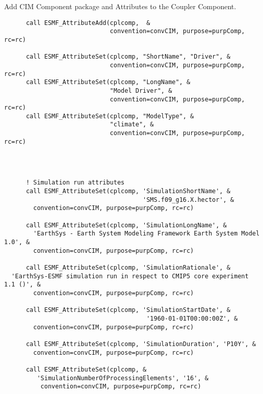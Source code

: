 
  \begin{sloppypar}
      Add CIM Component package and Attributes to the Coupler Component.
  \end{sloppypar} 

 \begin{verbatim}
      call ESMF_AttributeAdd(cplcomp,  &
                             convention=convCIM, purpose=purpComp, rc=rc)

      call ESMF_AttributeSet(cplcomp, "ShortName", "Driver", &
                             convention=convCIM, purpose=purpComp, rc=rc)
      call ESMF_AttributeSet(cplcomp, "LongName", &
                             "Model Driver", &
                             convention=convCIM, purpose=purpComp, rc=rc)
      call ESMF_AttributeSet(cplcomp, "ModelType", &
                             "climate", &
                             convention=convCIM, purpose=purpComp, rc=rc)
 
\end{verbatim}
 

 \begin{verbatim}


      ! Simulation run attributes
      call ESMF_AttributeSet(cplcomp, 'SimulationShortName', &
                                      'SMS.f09_g16.X.hector', &
        convention=convCIM, purpose=purpComp, rc=rc)

      call ESMF_AttributeSet(cplcomp, 'SimulationLongName', &
        'EarthSys - Earth System Modeling Framework Earth System Model 1.0', &
        convention=convCIM, purpose=purpComp, rc=rc)

      call ESMF_AttributeSet(cplcomp, 'SimulationRationale', &
  'EarthSys-ESMF simulation run in respect to CMIP5 core experiment 1.1 ()', &
        convention=convCIM, purpose=purpComp, rc=rc)

      call ESMF_AttributeSet(cplcomp, 'SimulationStartDate', &
                                       '1960-01-01T00:00:00Z', &
        convention=convCIM, purpose=purpComp, rc=rc)

      call ESMF_AttributeSet(cplcomp, 'SimulationDuration', 'P10Y', &
        convention=convCIM, purpose=purpComp, rc=rc)

      call ESMF_AttributeSet(cplcomp, &
         'SimulationNumberOfProcessingElements', '16', &
          convention=convCIM, purpose=purpComp, rc=rc)
 
\end{verbatim}
 
